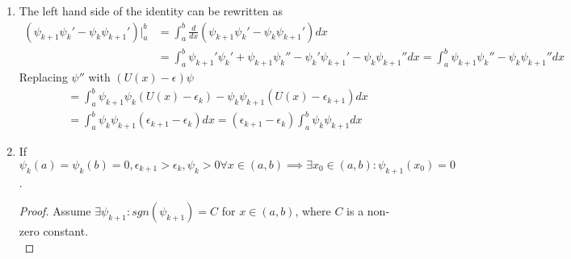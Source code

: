 \begin{sol}
\begin{enumerate}[label=\textbf{(\alph*)}]
\item
The left hand side of the identity can be rewritten as
\begin{equation}
\begin{aligned}
    (\psi_{k+1}\psi_k'-\psi_k\psi_{k+1}')|_a^b&=\int_a^b \frac{d}{dx}(\psi_{k+1}\psi_k'-\psi_k\psi_{k+1}')dx\\
    &=\int_a^b\psi_{k+1}'\psi_k'+\psi_{k+1}\psi_k''-\psi_k'\psi_{k+1}'-\psi_k\psi_{k+1}''dx
    =\int_a^b\psi_{k+1}\psi_k''-\psi_k\psi_{k+1}''dx
\end{aligned}
\end{equation}
Replacing $\psi''$ with $(U(x)-\epsilon)\psi$
\begin{equation}
\begin{aligned}
    &=\int_a^b\psi_{k+1}\psi_k(U(x)-\epsilon_k)-\psi_k\psi_{k+1}(U(x)-\epsilon_{k+1})dx\\
    &=\int_a^b\psi_k\psi_{k+1}(\epsilon_{k+1}-\epsilon_k)dx=(\epsilon_{k+1}-\epsilon_k)\int_a^b\psi_k\psi_{k+1}dx
\end{aligned}
\end{equation}
\item
If $\psi_{k}(a)=\psi_{k}(b)=0, \epsilon_{k+1}>\epsilon_k,\psi_{k}>0\forall x\in(a,b)\implies\exists x_0\in(a,b):\psi_{k+1}(x_0)=0$.
\begin{proof}
Assume $\exists\psi_{k+1}: sgn(\psi_{k+1})=C$  for $x\in(a,b)$, where $C$ is a non-zero constant. \\


\end{proof}
\end{enumerate}
\end{sol}

